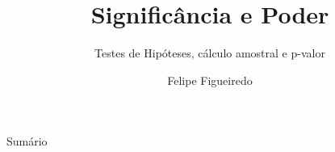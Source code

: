 \documentclass{beamer}
\title[Significância] %
{Significância e Poder}
\subtitle
 {Testes de Hipóteses, cálculo amostral e p-valor} %
\author%
{Felipe Figueiredo}%
\institute[] %
{
}
\date%
{}
\begin{document}
\begin{frame}
  \titlepage
\end{frame}

\begin{frame}{Sumário}
  \tableofcontents
\end{frame}








\end{document}
